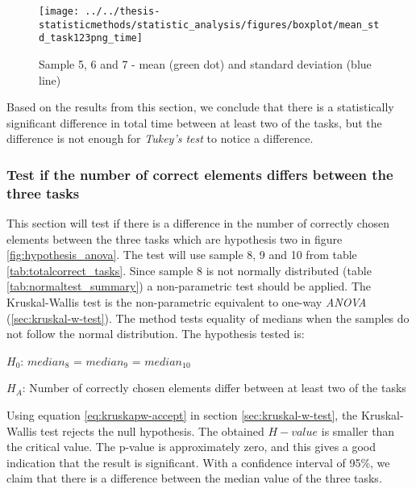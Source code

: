 \begin{figure}[H]
	\centering
	\texttt{[image: ../../thesis-statisticmethods/statistic\_analysis/figures/boxplot/mean\_std\_task123png\_time]}
	\caption{Sample 5, 6 and 7 - mean (green dot) and standard deviation (blue line)}
	\label{fig:meanstdtask123pngtime}
\end{figure}

\vspace{0.3cm}
Based on the results from this section, we conclude that there is a statistically significant difference in total time between at least two of the tasks, but the difference is not enough for \textit{Tukey's test} to notice a difference. 

\subsubsection[Sample 8, 9, and 10]{Test if the number of correct elements differs between the three tasks}\label{sec:sample_8_9_10_kruskal)} %
This section will test if there is a difference in the number of correctly chosen elements between the three tasks which are hypothesis two in figure \ref{fig:hypothesis_anova}. The test will use sample 8, 9 and 10 from table \ref{tab:totalcorrect_tasks}. Since sample 8 is not normally distributed (table \ref{tab:normaltest_summary}) a non-parametric test should be applied. The Kruskal-Wallis test is the non-parametric equivalent to one-way \textit{ANOVA} (\ref{sec:kruskal-w-test}). The method tests equality of medians when the samples do not follow the normal distribution. The hypothesis tested is: \\[0.2cm]

\centerline{$H_{0}$: $median_8$ = $median_9$ = $median_{10}$}
\centerline{$H_{A}$: Number of correctly chosen elements differ between at least two of the tasks}
\vspace{0.2cm}

Using equation \ref{eq:kruskapw-accept} in section \ref{sec:kruskal-w-test}, the Kruskal-Wallis test rejects the null hypothesis. The obtained $H-value$ is smaller than the critical value. The p-value is approximately zero, and this gives a good indication that the result is significant. With a confidence interval of 95\%, we claim that there is a difference between the median value of the three tasks. \\[0.2cm]

